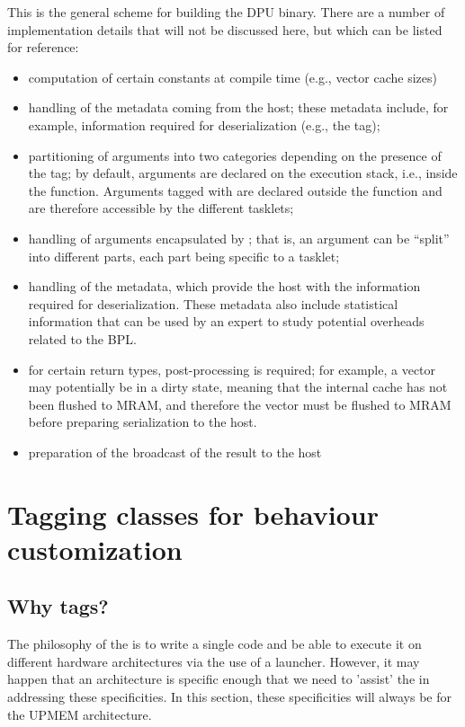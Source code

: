This is the general scheme for building the DPU binary. There are a number of implementation 
details that will not be discussed here, but which can be listed for reference:
\begin{itemize}
\item computation of certain constants at compile time (e.g., vector cache sizes)
\item handling of the  metadata coming from the host; these metadata include, 
for example, information required for deserialization (e.g., the  tag);
\item partitioning of arguments into two categories depending on the presence of the  tag; 
by default, arguments are declared on the execution stack, i.e., inside the  function. 
Arguments tagged with  are declared outside the  function and are therefore accessible 
by the different tasklets;
\item handling of arguments encapsulated by ; that is, an argument can be “split” into different 
parts, each part being specific to a tasklet;
\item handling of the  metadata, which provide the host with the information required for
deserialization. These metadata also include statistical information that can be used by an expert to study
potential overheads related to the BPL.
\item for certain return types, post-processing is required; for example, a vector may potentially be in a dirty
 state, meaning that the internal cache has not been flushed to MRAM, and therefore the vector must be flushed to 
 MRAM before preparing serialization to the host.
\item preparation of the broadcast of the result to the host
\end{itemize}	

\section{Tagging classes for behaviour customization}

\subsection{Why tags?}
The philosophy of the \BPL is to write a single code and be able to execute it on different hardware architectures 
via the use of a launcher. However, it may happen that an architecture is specific enough that we need to 'assist' 
the \BPL in addressing these specificities. In this section, these specificities will always be for the UPMEM architecture.

